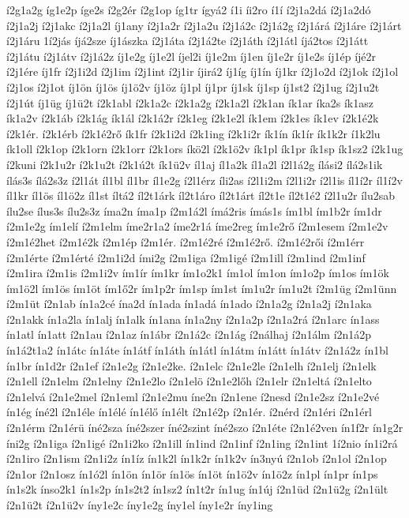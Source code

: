 {í2g1a2g
íg1e2p
íge2s
í2g2ér
í2g1op
íg1tr
ígyá2
í1i
íi2ro
í1í
í2j1a2dá
í2j1a2dó
í2j1a2j
í2j1akc
í2j1a2l
íj1any
í2j1a2r
í2j1a2u
í2j1á2c
í2j1á2g
í2j1árá
í2j1áre
í2j1árt
í2j1áru
1í2jás
íjá2sze
íj1ászka
í2j1áta
í2j1á2te
í2j1áth
í2j1átl
íjá2tos
í2j1átt
í2j1átu
í2j1átv
í2j1á2z
íj1e2g
íj1e2l
íjel2i
íj1e2m
íj1en
íj1e2r
íj1e2s
íj1ép
íjé2r
í2j1ére
íj1fr
í2j1i2d
í2j1im
í2j1int
í2j1ir
íjirá2
íj1íg
íj1ín
íj1kr
í2j1o2d
í2j1ok
í2j1ol
í2j1os
í2j1ot
íj1ön
íj1ös
íj1ö2v
íj1öz
íj1pl
íj1pr
íj1sk
íj1sp
íj1st2
í2j1ug
í2j1u2t
í2j1út
íj1üg
íj1ü2t
í2k1abl
í2k1a2c
í2k1a2g
í2k1a2l
í2k1an
ík1ar
íka2s
ík1asz
ík1a2v
í2k1áb
í2k1ág
ík1ál
í2k1á2r
í2k1eg
í2k1e2l
ík1em
í2k1es
ík1ev
í2k1é2k
í2k1ér.
í2k1érb
í2k1é2rő
ík1fr
í2k1i2d
í2k1ing
í2k1i2r
ík1ín
ík1ír
ík1k2r
í1k2lu
ík1oll
í2k1op
í2k1orn
í2k1orr
í2k1ors
íkö2l
í2k1ö2v
ík1pl
ík1pr
ík1sp
ík1sz2
í2k1ug
í2kuni
í2k1u2r
í2k1u2t
í2k1ú2t
ík1ü2v
íl1aj
íl1a2k
íl1a2l
í2l1á2g
ílási2
ílá2s1ik
ílás3s
ílá2s3z
í2l1át
íl1bl
íl1br
íl1e2g
í2l1érz
íli2as
í2l1i2m
í2l1i2r
í2l1is
íl1í2r
íl1í2v
íl1kr
íl1ös
íl1ö2z
íl1st
íltá2
íl2t1árk
íl2t1áro
íl2t1árt
íl2t1e
íl2t1é2
í2l1u2r
ílu2sab
ílu2se
ílus3s
ílu2s3z
íma2n
íma1p
í2m1á2l
ímá2ris
ímás1s
ím1bl
ím1b2r
ím1dr
í2m1e2g
ím1elí
í2m1elm
íme2r1a2
íme2r1á
íme2reg
ím1e2rő
í2m1esem
í2m1e2v
í2m1é2het
í2m1é2k
í2m1ép
í2m1ér.
í2m1é2ré
í2m1é2rő.
í2m1é2rői
í2m1érr
í2m1érte
í2m1érté
í2m1i2d
ími2g
í2m1iga
í2m1igé
í2m1ill
í2m1ind
í2m1inf
í2m1ira
í2m1is
í2m1i2v
ím1ír
ím1kr
ím1o2k1
ím1ol
ím1on
ím1o2p
ím1os
ím1ök
ím1ö2l
ím1ös
ím1öt
ím1ő2r
ím1p2r
ím1sp
ím1st
ím1u2r
ím1u2t
í2m1üg
í2m1ünn
í2m1üt
í2n1ab
ín1a2cé
ína2d
ín1ada
ín1adá
ín1ado
í2n1a2g
í2n1a2j
í2n1aka
í2n1akk
ín1a2la
ín1alj
ín1alk
ín1ana
ín1a2ny
í2n1a2p
í2n1a2rá
í2n1arc
ín1ass
ín1atl
ín1att
í2n1au
í2n1az
ín1ábr
í2n1á2c
í2n1ág
í2nálhaj
í2n1álm
í2n1á2p
ín1á2t1a2
ín1átc
ín1áte
ín1átf
ín1áth
ín1átl
ín1átm
ín1átt
ín1átv
í2n1á2z
ín1bl
ín1br
ín1d2r
í2n1ef
í2n1e2g
í2n1e2ke.
í2n1elc
í2n1e2le
í2n1elh
í2n1elj
í2n1elk
í2n1ell
í2n1elm
í2n1elny
í2n1e2lo
í2n1elö
í2n1e2lőh
í2n1elr
í2n1eltá
í2n1elto
í2n1elvá
í2n1e2mel
í2n1eml
í2n1e2mu
íne2n
í2n1ene
í2nesd
í2n1e2sz
í2n1e2vé
ín1ég
íné2l
í2n1éle
ín1élé
ín1élő
ín1élt
í2n1é2p
í2n1ér.
í2nérd
í2n1éri
í2n1érl
í2n1érm
í2n1érü
íné2sza
íné2szer
íné2szint
íné2szo
í2n1éte
í2n1é2ven
ín1f2r
ín1g2r
íni2g
í2n1iga
í2n1igé
í2n1i2ko
í2n1ill
ín1ind
í2n1inf
í2n1ing
í2n1int
1í2nio
ín1i2rá
í2n1iro
í2n1ism
í2n1i2z
ín1íz
ín1k2l
ín1k2r
ín1k2v
ín3nyú
í2n1ob
í2n1ol
í2n1op
í2n1or
í2n1osz
ín1ó2l
ín1ön
ín1ör
ín1ös
ín1öt
ín1ö2v
ín1ö2z
ín1pl
ín1pr
ín1ps
ín1s2k
ínso2k1
ín1s2p
ín1s2t2
ín1sz2
ín1t2r
ín1ug
ín1új
í2n1üd
í2n1ü2g
í2n1ült
í2n1ü2t
í2n1ü2v
íny1e2c
íny1e2g
íny1el
íny1e2r
íny1ing
}
